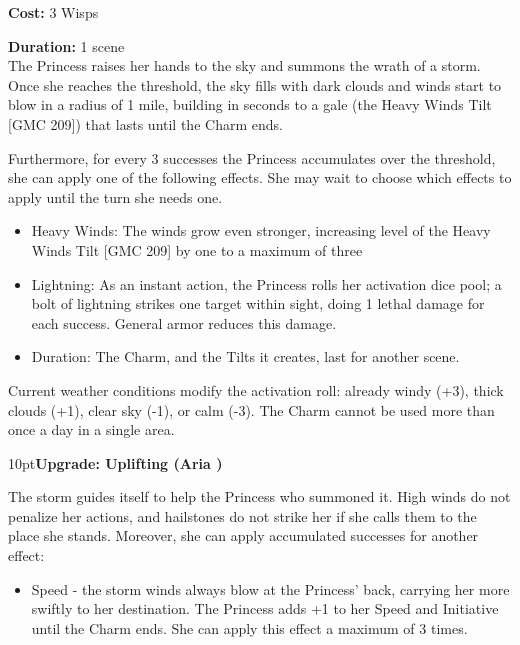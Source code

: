 \noindent \textbf{Cost:} 3 Wisps

\noindent \textbf{Duration:} 1 scene \\

\noindent The Princess raises her hands to the sky and summons the wrath of a storm. Once she reaches the threshold, the sky fills with dark clouds and winds start to blow in a radius of 1 mile, building in seconds to a gale (the Heavy Winds Tilt [GMC 209]) that lasts until the Charm ends. 

Furthermore, for every 3 successes the Princess accumulates over the threshold, she can apply one of the following effects. She may wait to choose which effects to apply until the turn she needs one.

\begin{itemize} 
 \item Heavy Winds: The winds grow even stronger, increasing level of the Heavy Winds Tilt [GMC 209] by one to a maximum of three
 \item Lightning: As an instant action, the Princess rolls her activation dice pool; a bolt of lightning strikes one target within sight, doing 1 lethal damage for each success. General armor reduces this damage.
 \item Duration: The Charm, and the Tilts it creates, last for another scene.\end{itemize}

Current weather conditions modify the activation roll: already windy (+3), thick clouds (+1), clear sky (-1), or calm (-3). The Charm cannot be used more than once a day in a single area.

\begin{myindentpar}{10pt}\textbf{Upgrade: Uplifting (Aria \textbullet\textbullet\textbullet\textbullet)}

The storm guides itself to help the Princess who summoned it. High winds do not penalize her actions, and hailstones do not strike her if she calls them to the place she stands. Moreover, she can apply accumulated successes for another effect:

\begin{itemize}\item    Speed - the storm winds always blow at the Princess' back, carrying her more swiftly to her destination. The Princess adds +1 to her Speed and Initiative until the Charm ends. She can apply this effect a maximum of 3 times.\end{itemize}\end{myindentpar}

